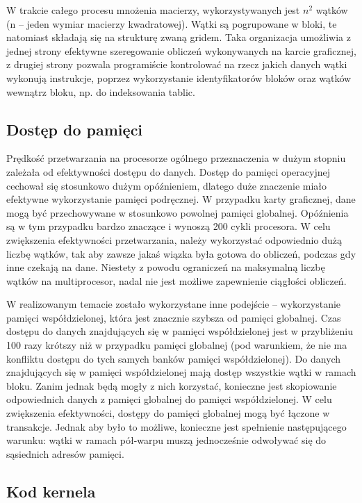 \documentclass[12pt,a4paper]{article}
\begin{document}
W trakcie całego procesu mnożenia macierzy, wykorzystywanych jest $n^2$ wątków (n -- jeden wymiar macierzy kwadratowej). Wątki są pogrupowane w bloki, te natomiast składają się na strukturę zwaną gridem. Taka organizacja umożliwia z jednej strony efektywne szeregowanie obliczeń wykonywanych na karcie graficznej, z drugiej strony pozwala programiście kontrolować na rzecz jakich danych wątki wykonują instrukcje, poprzez wykorzystanie identyfikatorów bloków oraz wątków wewnątrz bloku, np. do indeksowania tablic.

\subsection{Dostęp do pamięci}

Prędkość przetwarzania na procesorze ogólnego przeznaczenia w dużym stopniu zależała od efektywności dostępu do danych. Dostęp do pamięci operacyjnej cechował się stosunkowo dużym opóźnieniem, dlatego duże znaczenie miało efektywne wykorzystanie pamięci podręcznej.
W przypadku karty graficznej, dane mogą być przechowywane w stosunkowo powolnej pamięci globalnej. Opóźnienia są w tym przypadku bardzo znaczące i wynoszą 200 cykli procesora. W celu zwiększenia efektywności przetwarzania, należy wykorzystać odpowiednio dużą liczbę wątków, tak aby zawsze jakaś wiązka była gotowa do obliczeń, podczas gdy inne czekają na dane. Niestety z powodu ograniczeń na maksymalną liczbę wątków na multiprocesor, nadal nie jest możliwe zapewnienie ciągłości obliczeń.

W realizowanym temacie zostało wykorzystane inne podejście -- wykorzystanie pamięci współdzielonej, która jest znacznie szybsza od pamięci globalnej. Czas dostępu do danych znajdujących się w pamięci współdzielonej jest w przybliżeniu 100 razy krótszy niż w przypadku pamięci globalnej (pod warunkiem, że nie ma konfliktu dostępu do tych samych banków pamięci współdzielonej). Do danych znajdujących się w pamięci współdzielonej mają dostęp wszystkie wątki w ramach bloku. Zanim jednak będą mogły z nich korzystać, konieczne jest skopiowanie odpowiednich danych z pamięci globalnej do pamięci współdzielonej. W celu zwiększenia efektywności, dostępy do pamięci globalnej mogą być łączone w transakcje. Jednak aby było to możliwe, konieczne jest spełnienie następującego warunku: wątki w ramach pół-warpu muszą jednocześnie odwoływać się do sąsiednich adresów pamięci.


\subsection{Kod kernela}
\end{document}
